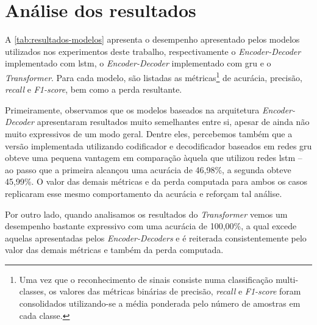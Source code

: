 \section{Análise dos resultados}
\label{sec:avaliacao-resultados}

A \autoref{tab:resultados-modelos} apresenta o desempenho apresentado pelos modelos utilizados nos experimentos deste trabalho, respectivamente o \textit{Encoder-Decoder} implementado com \acrshort{lstm}, o \textit{Encoder-Decoder} implementado com \acrshort{gru} e o \textit{Transformer}.
Para cada modelo, são listadas as métricas\footnote{
    Uma vez que o reconhecimento de sinais consiste numa classificação multi-classes, os valores das métricas binárias de precisão, \textit{recall} e \textit{F1-score} foram consolidados utilizando-se a média ponderada pelo número de amostras em cada classe.
} de acurácia, precisão, \textit{recall} e \textit{F1-score}, bem como a perda resultante.





Primeiramente, observamos que os modelos baseados na arquitetura \textit{Encoder-Decoder} apresentaram resultados muito semelhantes entre si, apesar de ainda não muito expressivos de um modo geral.
Dentre eles, percebemos também que a versão implementada utilizando codificador e decodificador baseados em redes \acrshort{gru} obteve uma pequena vantagem em comparação àquela que utilizou redes \acrshort{lstm} -- ao passo que a primeira alcançou uma acurácia de 46,98\%, a segunda obteve 45,99\%.
O valor das demais métricas e da perda computada para ambos os casos replicaram esse mesmo comportamento da acurácia e reforçam tal análise.

Por outro lado, quando analisamos os resultados do \textit{Transformer} vemos um desempenho bastante expressivo com uma acurácia de 100,00\%, a qual excede aquelas apresentadas pelos \textit{Encoder-Decoders} e é reiterada consistentemente pelo valor das demais métricas e também da perda computada.

